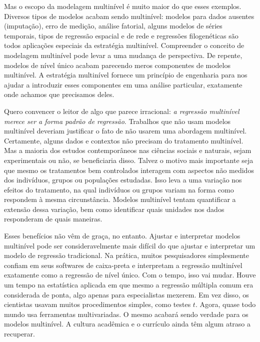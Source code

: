 Mas o escopo da modelagem multinível é muito maior do que esses exemplos. Diversos tipos de modelos acabam sendo multinível: modelos para dados ausentes (imputação), erro de medição, análise fatorial, alguns modelos de séries temporais, tipos de regressão espacial e de rede e regressões filogenéticas são todos aplicações especiais da estratégia multinível. Compreender o conceito de modelagem multinível pode levar a uma mudança de perspectiva. De repente, modelos de nível único acabam parecendo meros componentes de modelos multinível. A estratégia multinível fornece um princípio de engenharia para nos ajudar a introduzir esses componentes em uma análise particular, exatamente onde achamos que precisamos deles.

Quero convencer o leitor de algo que parece irracional: \textit{a regressão multinível merece ser a forma padrão de regressão}. Trabalhos que não usam modelos multinível deveriam justificar o fato de não usarem uma abordagem multinível. Certamente, alguns dados e contextos não precisam do tratamento multinível. Mas a maioria dos estudos contemporâneos nas ciências sociais e naturais, sejam experimentais ou não, se beneficiaria disso. Talvez o motivo mais importante seja que mesmo os tratamentos bem controlados interagem com aspectos não medidos dos indivíduos, grupos ou populações estudadas. Isso leva a uma variação nos efeitos do tratamento, na qual indivíduos ou grupos variam na forma como respondem à mesma circunstância. Modelos multinível tentam quantificar a extensão dessa variação, bem como identificar quais unidades nos dados responderam de quais maneiras.

Esses benefícios não vêm de graça, no entanto. Ajustar e interpretar modelos multinível pode ser consideravelmente mais difícil do que ajustar e interpretar um modelo de regressão tradicional. Na prática, muitos pesquisadores simplesmente confiam em seus softwares de caixa-preta e interpretam a regressão multinível exatamente como a regressão de nível único. Com o tempo, isso vai mudar. Houve um tempo na estatística aplicada em que mesmo a regressão múltipla comum era considerada de ponta, algo apenas para especialistas mexerem. Em vez disso, os cientistas usavam muitos procedimentos simples, como testes $t$. Agora, quase todo mundo usa ferramentas multivariadas. O mesmo acabará sendo verdade para os modelos multinível. A cultura acadêmica e o currículo ainda têm algum atraso a recuperar.

